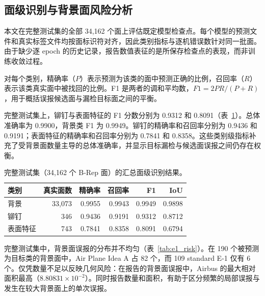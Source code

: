 \documentclass[12pt,a4paper]{ctexart}
\begin{document}
\subsection{面级识别与背景面风险分析}\label{sec:e1_results}

本文在完整测试集的全部 34,162 个面上评估既定模型检查点。每个模型的预测文件和真实标签文件均按面标识符对齐，因此类别指标与逐机错误数针对同一批面。由于缺少逐 epoch 的历史记录，报告数值表征的是所保存检查点的表现，而非训练收敛过程。

对每个类别，精确率（$P$）表示预测为该类的面中预测正确的比例，召回率（$R$）表示该类真实面中被找回的比例。F1 是两者的调和平均数，$F1 = 2PR/(P+R)$，用于概括误报候选面与漏检目标面之间的平衡。

完整测试集上，铆钉与表面特征的 F1 分数分别为 0.9312 和 0.8091（表~\ref{tab:e1_class_metrics}）。总体准确率为 0.9900，背景类 F1 为 0.9949。铆钉的精确率和召回率分别为 0.9436 和 0.9191；表面特征的精确率和召回率分别为 0.7841 和 0.8358。这些类别级指标补充了受背景面数量主导的总体准确率，并显示目标漏检与候选面误报之间仍存在权衡。

\begin{table}[!ht]
\centering
\small
\caption{完整测试集（34,162 个 B-Rep 面）的汇总面级识别结果。}\label{tab:e1_class_metrics}
\begin{tabular}{lrrrrr}
\toprule
类别 & 真实面数 & 精确率 & 召回率 & F1 & IoU \\
\midrule
背景 & 33,073 & 0.9955 & 0.9943 & 0.9949 & 0.9898 \\
铆钉 & 346 & 0.9436 & 0.9191 & 0.9312 & 0.8712 \\
表面特征 & 743 & 0.7841 & 0.8358 & 0.8091 & 0.6794 \\
\bottomrule
\end{tabular}
\end{table}

完整测试集中，背景面误报的分布并不均匀（表~\ref{tab:e1_risk}）。在 190 个被预测为目标类的背景面中，Air Plane Idea A 占 82 个，而 109 standard E-1 仅有 6 个。仅凭数量不足以反映几何风险：在报告的背景面误报中，Airbus 的最大相对面积最高（$8.80831\times10^{-2}$）。同时报告数量和面积，有助于区分频繁的局部误报与发生在较大背景面上的单次误报。
\end{document}
